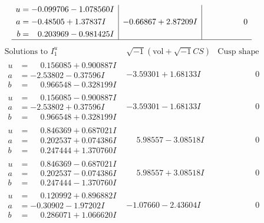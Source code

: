 \documentclass[1p]{elsarticle_modified}
\theoremstyle{definition}
\newcommand{\I}{\sqrt{-1}}
\begin{document}
$$\begin{array}{c|c|c}
\begin{aligned}
u &= -0.099706 - 1.078560 I \\
a &= -0.48505 + 1.37837 I \\
b &= \phantom{-}0.203969 - 0.981425 I\end{aligned}
 & -0.66867 + 2.87209 I & \phantom{-0.000000 } 0\\
 \hline 
 \end{array}$$\newpage$$\begin{array}{c|c|c}  
\text{Solutions to }I^u_{1}& \I (\text{vol} + \sqrt{-1}CS) & \text{Cusp shape}\\
 \hline 
\begin{aligned}
u &= \phantom{-}0.156085 + 0.900887 I \\
a &= -2.53802 - 0.37596 I \\
b &= \phantom{-}0.966548 - 0.328199 I\end{aligned}
 & -3.59301 + 1.68133 I & \phantom{-0.000000 } 0 \\ \hline\begin{aligned}
u &= \phantom{-}0.156085 - 0.900887 I \\
a &= -2.53802 + 0.37596 I \\
b &= \phantom{-}0.966548 + 0.328199 I\end{aligned}
 & -3.59301 - 1.68133 I & \phantom{-0.000000 } 0 \\ \hline\begin{aligned}
u &= \phantom{-}0.846369 + 0.687021 I \\
a &= \phantom{-}0.202537 + 0.074386 I \\
b &= \phantom{-}0.247444 + 1.370760 I\end{aligned}
 & \phantom{-}5.98557 - 3.08518 I & \phantom{-0.000000 } 0 \\ \hline\begin{aligned}
u &= \phantom{-}0.846369 - 0.687021 I \\
a &= \phantom{-}0.202537 - 0.074386 I \\
b &= \phantom{-}0.247444 - 1.370760 I\end{aligned}
 & \phantom{-}5.98557 + 3.08518 I & \phantom{-0.000000 } 0 \\ \hline\begin{aligned}
u &= \phantom{-}0.120992 + 0.896882 I \\
a &= -0.30902 - 1.97202 I \\
b &= \phantom{-}0.286071 + 1.066620 I\end{aligned}
 & -1.07660 - 2.43604 I & \phantom{-0.000000 } 0 \\ \hline\begin{aligned}

\end{aligned}
\end{array}$$
\end{document}
